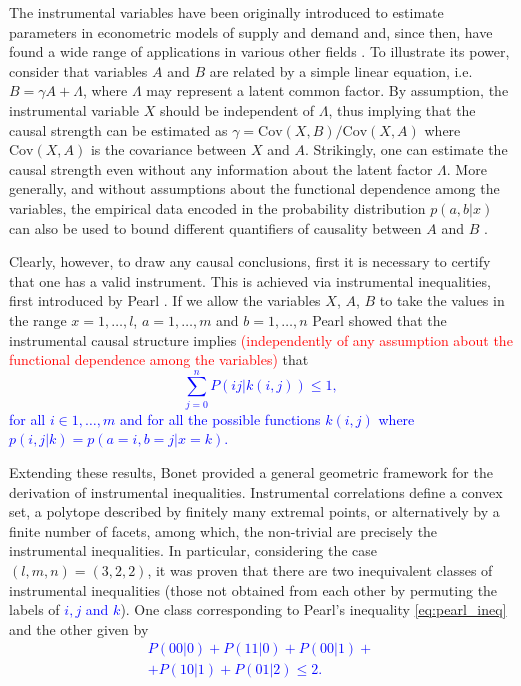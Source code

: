 \documentclass[letterpaper]{article}
\begin{document}
The instrumental variables have been originally introduced to estimate parameters
in econometric models of supply and demand \cite{economic} and, since then, have found a
wide range of applications in various other fields \cite{economic2, economic3}. To illustrate its
power, consider that variables $A$ and $B$ are related by a simple linear
equation, i.e. $B=\gamma A +\Lambda$, where $\Lambda$ may represent a latent common
factor. By assumption, the instrumental variable $X$ should be independent of
$\Lambda$, thus implying that the causal strength can be estimated as $\gamma=
\mathrm{Cov}(X,B)/\mathrm{Cov}(X,A)$ where $\mathrm{Cov}(X,A)$ is the covariance between $X$ and $A$. Strikingly, one can
estimate the causal strength even without any information about the latent
factor $\Lambda$. More generally, and without assumptions about the functional
dependence among the variables, the empirical data encoded in the probability
distribution $p(a,b \vert x)$ can also be used to bound different quantifiers of
causality between $A$ and $B$ \cite{pearlbook,Janzing2013}.


Clearly, however, to draw any causal conclusions, first it is necessary to
certify that one has a valid instrument. This is achieved via instrumental
inequalities, first introduced by Pearl \cite{pearl1995}. If we allow the variables $X$,
$A$, $B$ to take the values in the range  $x=1,\dots,l$, $a=1,\dots,m$ and
$b=1,\dots,n$ Pearl showed that the instrumental causal structure implies \textcolor{red}{(independently of any assumption about the functional dependence among the variables)} that 
\textcolor{blue}{
\begin{equation} 
    \sum_{j=0}^{n} P(ij|k(i,j)) \le 1,
    \label{eq:pearl_ineq}
\end{equation}
for all $i \in {1,\ldots, m}$ and for all the possible functions $k(i,j)$ where $p(i,j|k) = p(a=i,b=j\vert x=k)$.
}

Extending these results, Bonet \cite{bonet2001} provided a 
general geometric framework for the derivation of instrumental inequalities.
Instrumental correlations define a convex set, a polytope described by finitely
many extremal points, or alternatively by a finite number of facets, among which, the
non-trivial are precisely the instrumental inequalities. In particular,
considering the case $(l,m,n) = (3,2,2)$, it was proven that there are two
inequivalent classes of instrumental inequalities (those not obtained from each
other by permuting the labels of \textcolor{blue}{$i,j$ and $k$}). One class corresponding
to Pearl's inequality \eqref{eq:pearl_ineq} and the other given by
\textcolor{blue}{
\begin{multline}
    P(0 0 | 0) + P(1 1 | 0) + 
    P(0 0 | 1) +\\+ P(1 0 | 1) + 
    P(0 1 | 2) \le 2.
    \label{eq:bonet_ineq}
\end{multline}
}
\end{document}
